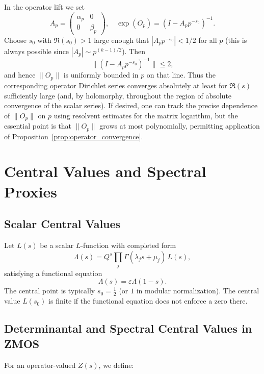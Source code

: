\documentclass[11pt]{article}
\begin{document}
In the operator lift we set
\[
  A_p = \begin{pmatrix}\alpha_p & 0\\0&\beta_p\end{pmatrix}, \quad
  \exp(O_p) = (I - A_p p^{-s_0})^{-1}.
\]
Choose $s_0$ with $\Re(s_0) > 1$ large enough that $|A_p p^{-s_0}|<1/2$
for all $p$ (this is always possible since $|A_p| \sim p^{(k-1)/2}$).
Then
\[
  \|(I - A_p p^{-s_0})^{-1}\| \le 2,
\]
and hence $\|O_p\|$ is uniformly bounded in $p$ on that line. Thus the
corresponding operator Dirichlet series converges absolutely at least
for $\Re(s)$ sufficiently large (and, by holomorphy, throughout the
region of absolute convergence of the scalar series). If desired, one
can track the precise dependence of $\|O_p\|$ on $p$ using resolvent
estimates for the matrix logarithm, but the essential point is that
$\|O_p\|$ grows at most polynomially, permitting application of
Proposition~\ref{prop:operator_convergence}.

\section{Central Values and Spectral Proxies}

\subsection{Scalar Central Values}

Let $L(s)$ be a scalar $L$-function with completed form
\[
  \Lambda(s) = Q^s \prod_j \Gamma(\lambda_j s + \mu_j)\, L(s),
\]
satisfying a functional equation
\[
  \Lambda(s) = \varepsilon \Lambda(1-s).
\]
The central point is typically $s_0 = \frac{1}{2}$ (or $1$ in modular
normalization). The central value $L(s_0)$ is finite if the functional
equation does not enforce a zero there.

\subsection{Determinantal and Spectral Central Values in ZMOS}

For an operator-valued $Z(s)$, we define:
\end{document}
